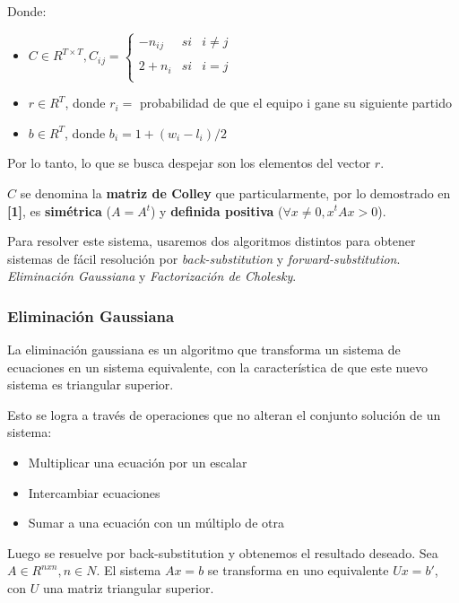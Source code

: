 Donde:

\begin{itemize}
\item 
$C \in R^{T \times T}, C{_i}{_j} =
\left\{
	\begin{array}{lcc}
		-n{_i}{_j} & si & i \neq j \\
		\\ 2 + n{_i} & si & i = j \\
	\end{array}
\right.$
\item $r \in R^{T}$, donde $r{_i} = $ probabilidad de que el equipo i gane su siguiente partido
\item $b \in R^{T}$, donde $b{_i} = 1 + (w{_i} - l{_i}) / 2$
\end{itemize}

Por lo tanto, lo que se busca despejar son los elementos del vector $r$.

$C$ se denomina la \textbf{matriz de Colley} que particularmente, por lo demostrado en \textbf{[1]}, es \textbf{sim\'etrica} ($A = A{^t}$) y \textbf{definida positiva} ($\forall x \neq 0, x^{t}Ax > 0$).

Para resolver este sistema, usaremos dos algoritmos distintos para obtener sistemas de f\'acil resoluci\'on por \textit{back-substitution} y \textit{forward-substitution}. \textit{Eliminaci\'on Gaussiana} y \textit{Factorizaci\'on de Cholesky}.

\subsubsection{Eliminaci\'on Gaussiana}

La eliminaci\'on gaussiana es un algoritmo que transforma un sistema de ecuaciones en un sistema equivalente, con la caracter\'istica de que este nuevo sistema es triangular superior.

Esto se logra a través de operaciones que no alteran el conjunto solución de un sistema:

\begin{itemize}
\item Multiplicar una ecuación por un escalar
\item Intercambiar ecuaciones
\item Sumar a una ecuación con un múltiplo de otra
\end{itemize} 

Luego se resuelve por back-substitution y obtenemos el resultado deseado. Sea $A \in R^{nxn}, n \in N$. El sistema $Ax = b$ se transforma en uno equivalente $Ux = b'$, con $U$ una matriz triangular superior. \\

